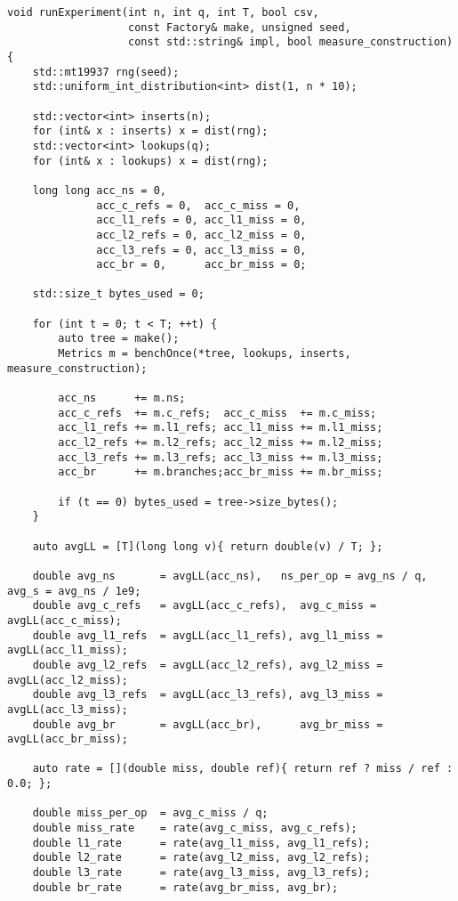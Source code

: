 \begin{lstlisting}
void runExperiment(int n, int q, int T, bool csv,
                   const Factory& make, unsigned seed,
                   const std::string& impl, bool measure_construction)
{
    std::mt19937 rng(seed);
    std::uniform_int_distribution<int> dist(1, n * 10);

    std::vector<int> inserts(n);
    for (int& x : inserts) x = dist(rng);
    std::vector<int> lookups(q);
    for (int& x : lookups) x = dist(rng);

    long long acc_ns = 0,
              acc_c_refs = 0,  acc_c_miss = 0,
              acc_l1_refs = 0, acc_l1_miss = 0,
              acc_l2_refs = 0, acc_l2_miss = 0,
              acc_l3_refs = 0, acc_l3_miss = 0,
              acc_br = 0,      acc_br_miss = 0;

    std::size_t bytes_used = 0;

    for (int t = 0; t < T; ++t) {
        auto tree = make();
        Metrics m = benchOnce(*tree, lookups, inserts, measure_construction);

        acc_ns      += m.ns;
        acc_c_refs  += m.c_refs;  acc_c_miss  += m.c_miss;
        acc_l1_refs += m.l1_refs; acc_l1_miss += m.l1_miss;
        acc_l2_refs += m.l2_refs; acc_l2_miss += m.l2_miss;
        acc_l3_refs += m.l3_refs; acc_l3_miss += m.l3_miss;
        acc_br      += m.branches;acc_br_miss += m.br_miss;

        if (t == 0) bytes_used = tree->size_bytes();
    }

    auto avgLL = [T](long long v){ return double(v) / T; };

    double avg_ns       = avgLL(acc_ns),   ns_per_op = avg_ns / q, avg_s = avg_ns / 1e9;
    double avg_c_refs   = avgLL(acc_c_refs),  avg_c_miss = avgLL(acc_c_miss);
    double avg_l1_refs  = avgLL(acc_l1_refs), avg_l1_miss = avgLL(acc_l1_miss);
    double avg_l2_refs  = avgLL(acc_l2_refs), avg_l2_miss = avgLL(acc_l2_miss);
    double avg_l3_refs  = avgLL(acc_l3_refs), avg_l3_miss = avgLL(acc_l3_miss);
    double avg_br       = avgLL(acc_br),      avg_br_miss = avgLL(acc_br_miss);

    auto rate = [](double miss, double ref){ return ref ? miss / ref : 0.0; };

    double miss_per_op  = avg_c_miss / q;
    double miss_rate    = rate(avg_c_miss, avg_c_refs);
    double l1_rate      = rate(avg_l1_miss, avg_l1_refs);
    double l2_rate      = rate(avg_l2_miss, avg_l2_refs);
    double l3_rate      = rate(avg_l3_miss, avg_l3_refs);
    double br_rate      = rate(avg_br_miss, avg_br);


\end{lstlisting}
